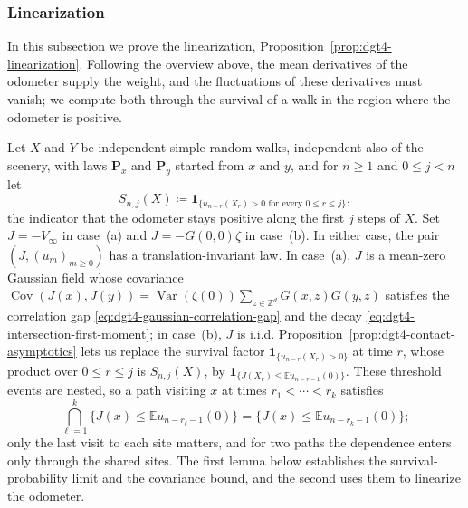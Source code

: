 \documentclass[11pt]{amsart}
\theoremstyle{plain}
\theoremstyle{definition}
\newcommand{\Z}{\mathbb{Z}}
\newcommand{\E}{\mathbb{E}}
\DeclareMathOperator{\Var}{Var}
\DeclareMathOperator{\Cov}{Cov}
\newcommand{\one}{\mathbf{1}}
\begin{document}
\subsubsection{Linearization}
\label{ssec:dgt4-linearization-conclusion}
	In this subsection we prove the linearization, Proposition~\ref{prop:dgt4-linearization}.
	Following the overview above, the mean derivatives of the odometer supply the weight, and
	the fluctuations of these derivatives must vanish; we compute both through the survival of a
	walk in the region where the odometer is positive.

	Let $X$ and
	$Y$ be independent simple random walks, independent also of the scenery, with laws
	$\mathbf P_x$ and $\mathbf P_y$ started from $x$ and $y$, and for $n\geq1$ and
	$0\leq j<n$ let
	\[
		S_{n,j}(X)\coloneqq\one_{\{u_{n-r}(X_r)>0\text{ for every }0\leq r\leq j\}},
	\]
	the indicator that the odometer stays positive along the first $j$ steps of $X$.
	Set $J=-V_\infty$ in case~\textup{(a)} and $J=-G(0,0)\zeta$ in
	case~\textup{(b)}. In either case, the pair $(J,(u_m)_{m\geq0})$ has a translation-invariant law. In case~\textup{(a)}, $J$ is a mean-zero Gaussian field whose covariance
    $\Cov(J(x),J(y))=\Var(\zeta(0))\sum_{z\in\Z^d}G(x,z)G(y,z)$ satisfies the correlation gap
	\eqref{eq:dgt4-gaussian-correlation-gap} and the decay \eqref{eq:dgt4-intersection-first-moment}; in
	case~\textup{(b)}, $J$ is i.i.d.
	Proposition~\ref{prop:dgt4-contact-asymptotics} lets us replace the survival factor
	$\one_{\{u_{n-r}(X_r)>0\}}$ at time $r$, whose product over $0\leq r\leq j$ is $S_{n,j}(X)$,
	by $\one_{\{J(X_r)\leq\E u_{n-r-1}(0)\}}$.
	These threshold events are nested, so a path visiting $x$ at times $r_1<\cdots<r_k$
	satisfies
	\[
		\bigcap_{\ell=1}^k\{J(x)\leq\E u_{n-r_\ell-1}(0)\}=\{J(x)\leq\E u_{n-r_k-1}(0)\};
	\]
	only the last visit to each site matters, and for two paths the dependence enters only
	through the shared sites. The first lemma below establishes the survival-probability limit
	and the covariance bound, and the second uses them to linearize the odometer.
\end{document}
